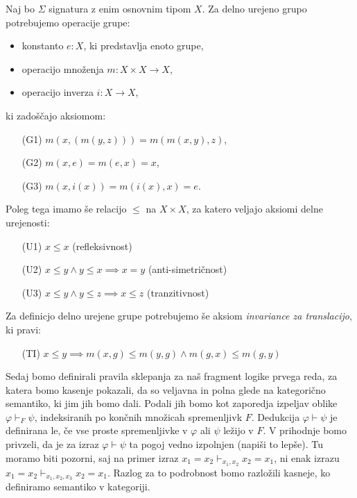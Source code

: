 \documentclass[../kategoricna_logika.tex]{subfiles}
\begin{document}
\begin{primer}\label{primer:delno-urejene-grupe}
  Naj bo $\Sigma$ signatura z enim osnovnim tipom $X$. Za delno urejeno grupo potrebujemo operacije grupe:
  \begin{itemize}
    \item konstanto $e : X$, ki predstavlja enoto grupe,
    \item operacijo množenja $m : X \times X \to X$,
    \item operacijo inverza $i : X \to X$,
  \end{itemize}
  ki zadoščajo aksiomom:
  \begin{itemize}
    \item[(G1)] $m(x,(m(y,z))) = m(m(x,y), z)$,
    \item[(G2)] $m(x,e) = m(e,x) = x$,
    \item[(G3)] $m(x,i(x)) = m(i(x), x) = e$.
  \end{itemize}
  Poleg tega imamo še relacijo $\leq$ na $X \times X$, za katero veljajo aksiomi delne urejenosti:
  \begin{itemize}
    \item[(U1)] $x \leq x$ (refleksivnost)
    \item[(U2)] $x \leq y \wedge y \leq x \implies x = y$ (anti-simetričnost)
    \item[(U3)] $x \leq y \wedge y \leq z \implies x \leq z$ (tranzitivnost)
  \end{itemize}
  Za definicjo delno urejene grupe potrebujemo še aksiom \emph{invariance za translacijo},
  ki pravi:
  \begin{itemize}
    \item[(TI)] $x \leq y \implies m(x, g) \leq m(y, g) \wedge m(g,x) \leq m(g,y)$
  \end{itemize}
\end{primer}

Sedaj bomo definirali pravila sklepanja za naš fragment logike prvega reda, 
za katera bomo kasenje pokazali, da so veljavna in polna glede na kategorično semantiko,
ki jim jih bomo dali.
Podali jih bomo kot zaporedja izpeljav oblike $\varphi \vdash_F \psi$, indeksiranih po končnih množicah spremenljivk $F$. Dedukcija $\varphi \vdash \psi$ je definirana le, če vse proste spremenljivke v $\varphi$ ali $\psi$ ležijo v $F$. V prihodnje bomo privzeli, da je za izraz $\varphi \vdash \psi$ ta pogoj vedno izpolnjen (napiši to lepše).
Tu moramo biti pozorni, saj na primer izraz $x_1 = x_2 \vdash_{x_1, x_2} x_2 = x_1$,
ni enak izrazu $x_1 = x_2 \vdash_{x_1, x_2, x_3} x_2 = x_1$.
Razlog za to podrobnost bomo razložili kasneje, ko definiramo semantiko v kategoriji.
\end{document}
